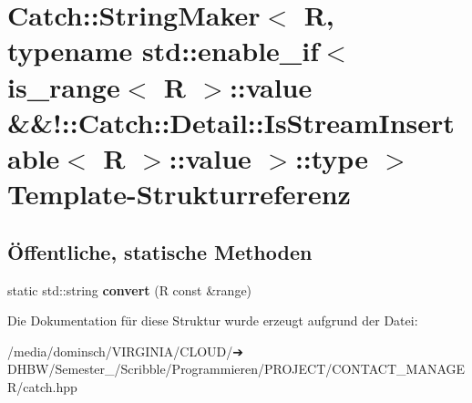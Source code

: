 \hypertarget{structCatch_1_1StringMaker_3_01R_00_01typename_01std_1_1enable__if_3_01is__range_3_01R_01_4_1_1ve8233c20b54b69b4771fbd413409d181}{}\section{Catch\+:\+:String\+Maker$<$ R, typename std\+:\+:enable\+\_\+if$<$ is\+\_\+range$<$ R $>$\+:\+:value \&\&!\+:\+:Catch\+:\+:Detail\+:\+:Is\+Stream\+Insertable$<$ R $>$\+:\+:value $>$\+:\+:type $>$ Template-\/\+Strukturreferenz}
\label{structCatch_1_1StringMaker_3_01R_00_01typename_01std_1_1enable__if_3_01is__range_3_01R_01_4_1_1ve8233c20b54b69b4771fbd413409d181}
\subsection*{Öffentliche, statische Methoden}
\begin{DoxyCompactItemize}
\item 
\mbox{\label{structCatch_1_1StringMaker_3_01R_00_01typename_01std_1_1enable__if_3_01is__range_3_01R_01_4_1_1ve8233c20b54b69b4771fbd413409d181_ac6088db00103a7482fb9bc04b1603362}} 
static std\+::string {\bfseries convert} (R const \&range)
\end{DoxyCompactItemize}


Die Dokumentation für diese Struktur wurde erzeugt aufgrund der Datei\+:\begin{DoxyCompactItemize}
\item 
/media/dominsch/\+V\+I\+R\+G\+I\+N\+I\+A/\+C\+L\+O\+U\+D/➔ D\+H\+B\+W/\+Semester\+\_/\+Scribble/\+Programmieren/\+P\+R\+O\+J\+E\+C\+T/\+C\+O\+N\+T\+A\+C\+T\+\_\+\+M\+A\+N\+A\+G\+E\+R/catch.\+hpp\end{DoxyCompactItemize}
